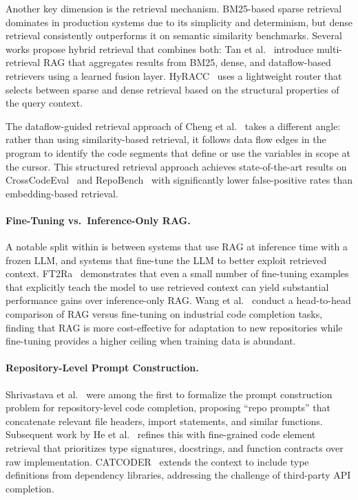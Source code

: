 Another key dimension is the retrieval mechanism. BM25-based sparse retrieval dominates in
production systems due to its simplicity and determinism, but dense retrieval consistently
outperforms it on semantic similarity benchmarks. Several works propose hybrid retrieval that
combines both: Tan et al.~\cite{tan2025prompt} introduce multi-retrieval RAG that aggregates
results from BM25, dense, and dataflow-based retrievers using a learned fusion layer.
HyRACC~\cite{li2025hyracc} uses a lightweight router that selects between sparse and dense
retrieval based on the structural properties of the query context.

The dataflow-guided retrieval approach of Cheng et al.~\cite{cheng2024dataflow} takes a
different angle: rather than using similarity-based retrieval, it follows data flow edges in
the program to identify the code segments that define or use the variables in scope at the
cursor. This structured retrieval approach achieves state-of-the-art results on
CrossCodeEval~\cite{ding2023crosscodeeval} and RepoBench~\cite{liu2024repobench} with
significantly lower false-positive rates than embedding-based retrieval.

\paragraph{Fine-Tuning vs.\ Inference-Only RAG.}
A notable split within  is between systems that use RAG at inference time with a
frozen LLM, and systems that fine-tune the LLM to better exploit retrieved context.
FT2Ra~\cite{guo2024ft2ra} demonstrates that even a small number of fine-tuning examples that
explicitly teach the model to use retrieved context can yield substantial performance gains over
inference-only RAG. Wang et al.~\cite{wang2025ragvsft} conduct a head-to-head comparison of
RAG versus fine-tuning on industrial code completion tasks, finding that RAG is more
cost-effective for adaptation to new repositories while fine-tuning provides a higher ceiling
when training data is abundant.

\paragraph{Repository-Level Prompt Construction.}
Shrivastava et al.~\cite{shrivastava2023repolevel} were among the first to formalize the
prompt construction problem for repository-level code completion, proposing ``repo prompts''
that concatenate relevant file headers, import statements, and similar functions. Subsequent
work by He et al.~\cite{he2025cecoder} refines this with fine-grained code element retrieval
that prioritizes type signatures, docstrings, and function contracts over raw implementation.
CATCODER~\cite{pan2025catcoder} extends the context to include type definitions from
dependency libraries, addressing the challenge of third-party API completion.

